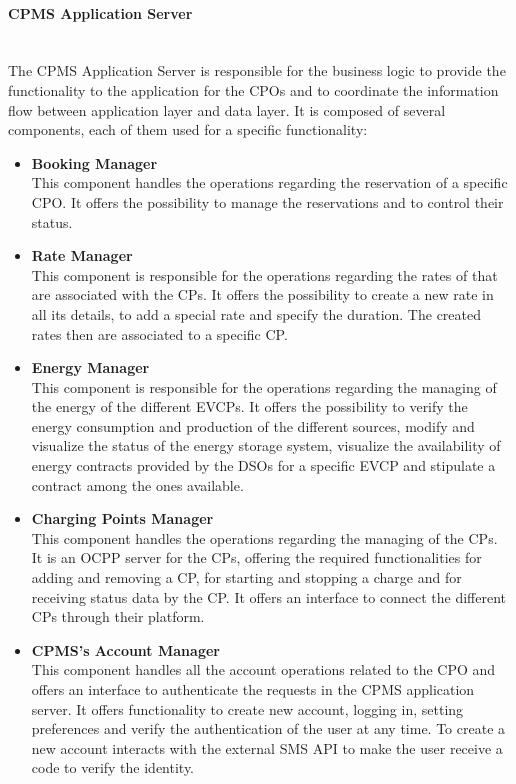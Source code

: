 \paragraph*{CPMS Application Server} \hfill \\
The CPMS Application Server is responsible for the business logic to provide the functionality to the application for the CPOs and to coordinate the information flow between application layer and data layer.
It is composed of several components, each of them used for a specific functionality:\\
\begin{itemize}
    \item \textbf{Booking Manager} \\
          This component handles the operations regarding the reservation of a specific CPO. It offers the possibility to manage the reservations and to control their status.
    \item \textbf{Rate Manager} \\ This component is responsible for the operations regarding the rates of that are associated with the CPs. It offers the possibility to
          create a new rate in all its details, to add a special rate and specify the duration. The created rates then are associated to a specific CP.
    \item \textbf{Energy Manager} \\ This component is responsible for the operations regarding the managing of the energy of the different EVCPs.
          It offers the possibility to verify the energy consumption and production of the different sources, modify and visualize the status of the energy storage system,
          visualize the availability of energy contracts provided by the DSOs for a specific EVCP and stipulate a contract among the ones available.
    \item \textbf{Charging Points Manager} \\ This component handles the operations regarding the managing of the CPs. It is an OCPP server for the CPs, offering the
          required functionalities for adding and removing a CP, for starting and stopping a charge and for receiving status data by the CP. It offers an interface to connect the different CPs through their platform.
    \item \textbf{CPMS's Account Manager} \\ This component handles all the account operations related to the CPO and offers an interface to authenticate the requests in the CPMS application server.
          It offers functionality to create new account, logging in, setting preferences and verify the authentication of the user at any time.
          To create a new account interacts with the external SMS API to make the user receive a code to verify the identity.
\end{itemize}

